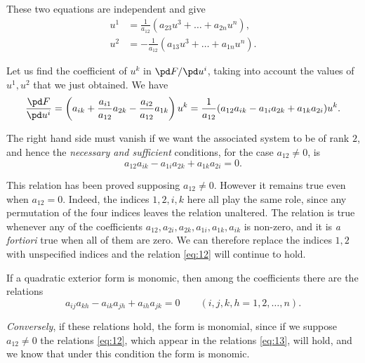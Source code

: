 These two equations are independent and give
\begin{align*}
  u^{1}&=\frac{1}{a_{12}}(a_{23}u^{3}+\dots+a_{2n}u^{n}),\\
  u^{2}&=-\frac{1}{a_{12}}(a_{13}u^{3}+\dots+a_{1n}u^{n}).
\end{align*}

Let us find the coefficient of $u^{k}$ in $\pd F/\pd u^{i}$, taking into account the values of $u^{1},u^{2}$ that we just obtained. We have
\[
\frac{\pd F}{\pd u^{i}}=\left(a_{ik}+\frac{a_{i1}}{a_{12}}a_{2k}-\frac{a_{i2}}{a_{12}}a_{1k}\right)u^{k}=\frac{1}{a_{12}}(a_{12}a_{ik}-a_{1i}a_{2k}+a_{1k}a_{2i})u^{k}.
\]

The right hand side must vanish if we want the associated system to be of rank $2$, and hence the \emph{necessary and sufficient} conditions, for the case $a_{12}\neq 0$, is
\begin{equation}
  \label{eq:12}
  a_{12}a_{ik}-a_{1i}a_{2k}+a_{1k}a_{2i}=0.
\end{equation}

This relation has been proved supposing $a_{12}\neq 0$. However it remains true even when $a_{12}=0$. Indeed, the indices $1,2,i,k$ here all play the same role, since any permutation of the four indices leaves the relation unaltered. The relation is true whenever any of the coefficients $a_{12},a_{2i},a_{2k},a_{1i},a_{1k},a_{ik}$ is non-zero, and it is \emph{a fortiori} true when all of them are zero. We can therefore replace the indices $1,2$ with unspecified indices and the relation \eqref{eq:12} will continue to hold.

\begin{thm*}
  If a quadratic exterior form is monomic, then  among the coefficients there are the relations
  \begin{equation}
    \label{eq:13}
    a_{ij}a_{kh}-a_{ik}a_{jh}+a_{ih}a_{jk}=0\qquad(i,j,k,h=1,2,\dots,n).
  \end{equation}
\end{thm*}

\emph{Conversely}, if these relations hold, the form is monomial, since if we suppose $a_{12}\neq 0$ the relations \eqref{eq:12}, which appear in the relations \eqref{eq:13}, will hold, and we know that under this condition the form is monomic.

